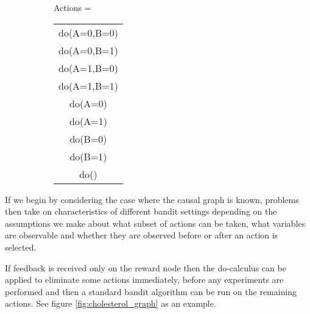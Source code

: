 \documentclass[11pt,a4paper]{article}
\begin{document}
\begin{figure}[h]
\caption{A simple causal graphical model and corresponding complete action space. A and B represent binary variables that can be intervened on and Y represents the reward.}
\label{fig:unify_frameworks}
\centering
\begin{subfigure}[c]{0.3\textwidth}
\end{subfigure}
\begin{subfigure}[t]{0.4\textwidth}
Actions = \begin{tabular}{|c|}
	\hline
  do(A=0,B=0) \\
  do(A=0,B=1) \\
  do(A=1,B=0) \\
  do(A=1,B=1) \\
  \hline
  do(A=0) \\
  do(A=1) \\
  do(B=0) \\
  do(B=1) \\
  do() \\
  \hline
\end{tabular}
\end{subfigure}
\end{figure}



If we begin by considering the case where the causal graph is known, problems then take on characteristics of different bandit settings depending on the assumptions we make about what subset of actions can be taken, what variables are observable and whether they are observed before or after an action is selected. 

If feedback is received only on the reward node then the do-calculus can be applied to eliminate some actions immediately, before any experiments are performed and then a standard bandit algorithm can be run on the remaining actions. See figure \ref{fig:cholesterol_graph} as an example. 
\end{document}
